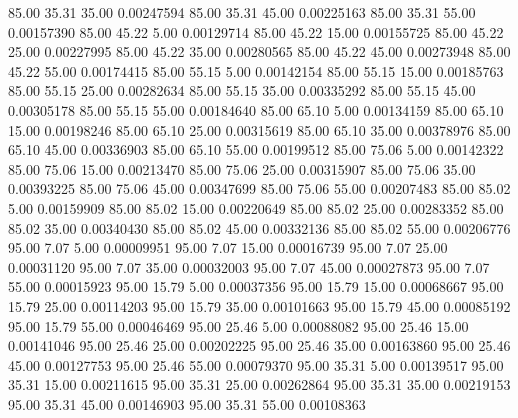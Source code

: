      85.00     35.31     35.00     0.00247594
     85.00     35.31     45.00     0.00225163
     85.00     35.31     55.00     0.00157390
     85.00     45.22      5.00     0.00129714
     85.00     45.22     15.00     0.00155725
     85.00     45.22     25.00     0.00227995
     85.00     45.22     35.00     0.00280565
     85.00     45.22     45.00     0.00273948
     85.00     45.22     55.00     0.00174415
     85.00     55.15      5.00     0.00142154
     85.00     55.15     15.00     0.00185763
     85.00     55.15     25.00     0.00282634
     85.00     55.15     35.00     0.00335292
     85.00     55.15     45.00     0.00305178
     85.00     55.15     55.00     0.00184640
     85.00     65.10      5.00     0.00134159
     85.00     65.10     15.00     0.00198246
     85.00     65.10     25.00     0.00315619
     85.00     65.10     35.00     0.00378976
     85.00     65.10     45.00     0.00336903
     85.00     65.10     55.00     0.00199512
     85.00     75.06      5.00     0.00142322
     85.00     75.06     15.00     0.00213470
     85.00     75.06     25.00     0.00315907
     85.00     75.06     35.00     0.00393225
     85.00     75.06     45.00     0.00347699
     85.00     75.06     55.00     0.00207483
     85.00     85.02      5.00     0.00159909
     85.00     85.02     15.00     0.00220649
     85.00     85.02     25.00     0.00283352
     85.00     85.02     35.00     0.00340430
     85.00     85.02     45.00     0.00332136
     85.00     85.02     55.00     0.00206776
     95.00      7.07      5.00     0.00009951
     95.00      7.07     15.00     0.00016739
     95.00      7.07     25.00     0.00031120
     95.00      7.07     35.00     0.00032003
     95.00      7.07     45.00     0.00027873
     95.00      7.07     55.00     0.00015923
     95.00     15.79      5.00     0.00037356
     95.00     15.79     15.00     0.00068667
     95.00     15.79     25.00     0.00114203
     95.00     15.79     35.00     0.00101663
     95.00     15.79     45.00     0.00085192
     95.00     15.79     55.00     0.00046469
     95.00     25.46      5.00     0.00088082
     95.00     25.46     15.00     0.00141046
     95.00     25.46     25.00     0.00202225
     95.00     25.46     35.00     0.00163860
     95.00     25.46     45.00     0.00127753
     95.00     25.46     55.00     0.00079370
     95.00     35.31      5.00     0.00139517
     95.00     35.31     15.00     0.00211615
     95.00     35.31     25.00     0.00262864
     95.00     35.31     35.00     0.00219153
     95.00     35.31     45.00     0.00146903
     95.00     35.31     55.00     0.00108363

